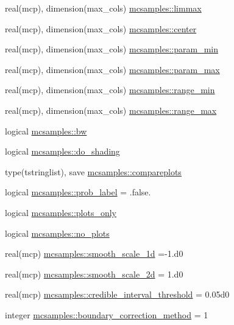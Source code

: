 \begin{DoxyCompactItemize}
$$real(mcp), dimension(max\+\_\+cols) \mbox{\hyperlink{namespacemcsamples_a3454f7bb4ef6c4c43f38a3778b39f1ca}{mcsamples\+::limmax}}
\item 
real(mcp), dimension(max\+\_\+cols) \mbox{\hyperlink{namespacemcsamples_a99b1b2fc1a0d5d3e797fa8716a294f6a}{mcsamples\+::center}}
\item 
real(mcp), dimension(max\+\_\+cols) \mbox{\hyperlink{namespacemcsamples_a3c28ccd747cefdd44e51bee5809f7cf2}{mcsamples\+::param\+\_\+min}}
\item 
real(mcp), dimension(max\+\_\+cols) \mbox{\hyperlink{namespacemcsamples_a85c3a30e0056c5dcec952621d4782012}{mcsamples\+::param\+\_\+max}}
\item 
real(mcp), dimension(max\+\_\+cols) \mbox{\hyperlink{namespacemcsamples_a1ad9378542a0d4ed8222e002f28b8a4f}{mcsamples\+::range\+\_\+min}}
\item 
real(mcp), dimension(max\+\_\+cols) \mbox{\hyperlink{namespacemcsamples_adb075c5195b30137b257a06000257c4a}{mcsamples\+::range\+\_\+max}}
\item 
logical \mbox{\hyperlink{namespacemcsamples_abfadadd4fe7cc368f0f005a352298f33}{mcsamples\+::bw}}
\item 
logical \mbox{\hyperlink{namespacemcsamples_aea44d2c9cd7dfbed7881a38450903a64}{mcsamples\+::do\+\_\+shading}}
\item 
type(tstringlist), save \mbox{\hyperlink{namespacemcsamples_a69983643fd9f3aed82247d3eb19d8ba0}{mcsamples\+::compareplots}}
\item 
logical \mbox{\hyperlink{namespacemcsamples_ad626a7a57271fbc966f7d06ed74f68af}{mcsamples\+::prob\+\_\+label}} = .false.
\item 
logical \mbox{\hyperlink{namespacemcsamples_ad6a6de60cc3e044646e884be9bdc3b67}{mcsamples\+::plots\+\_\+only}}
\item 
logical \mbox{\hyperlink{namespacemcsamples_a38fc836d9b47b5b811c875938d43d2c9}{mcsamples\+::no\+\_\+plots}}
\item 
real(mcp) \mbox{\hyperlink{namespacemcsamples_aa4a60a69265c0e88d0f93113ca84e3bf}{mcsamples\+::smooth\+\_\+scale\+\_\+1d}} =-\/1.d0
\item 
real(mcp) \mbox{\hyperlink{namespacemcsamples_a303a66c9ef1a6bf38167952d63caf780}{mcsamples\+::smooth\+\_\+scale\+\_\+2d}} = 1.d0
\item 
real(mcp) \mbox{\hyperlink{namespacemcsamples_ae1862ffcd750637a6e92a95ec020c591}{mcsamples\+::credible\+\_\+interval\+\_\+threshold}} = 0.\+05d0
\item 
integer \mbox{\hyperlink{namespacemcsamples_a72368716a8ad215156d18cf044952cdc}{mcsamples\+::boundary\+\_\+correction\+\_\+method}} = 1
\end{DoxyCompactItemize}


